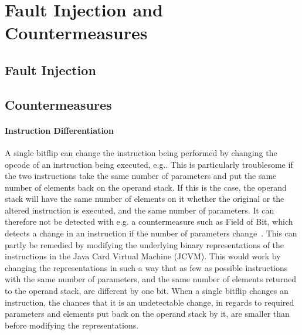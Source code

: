 \section{Fault Injection and Countermeasures}
\subsection{Fault Injection}
\subsection{Countermeasures}
\paragraph{Instruction Differentiation} 
A single bitflip can change the instruction being performed by changing the opcode of an instruction being executed, e.g.. This is particularly troublesome if the two instructions take the same number of parameters and put the same number of elements back on the operand stack. If this is the case, the operand stack will have the same number of elements on it whether the original or the altered instruction is executed, and the same number of parameters. It can therefore not be detected with e.g. a countermeasure such as Field of Bit, which detects a change in an instruction if the number of parameters change~\cite[p. 16]{javasec}.
This can partly be remedied by modifying the underlying binary representations of the instructions in the Java Card Virtual Machine (JCVM).
This would work by changing the representations in such a way that as few as possible instructions with the same number of parameters, and the same number of elements returned to the operand stack, are different by one bit. 
When a single bitflip changes an instruction, the chances that it is an undetectable change, in regards to required parameters and elements put back on the operand stack by it, are smaller than before modifying the representations.

